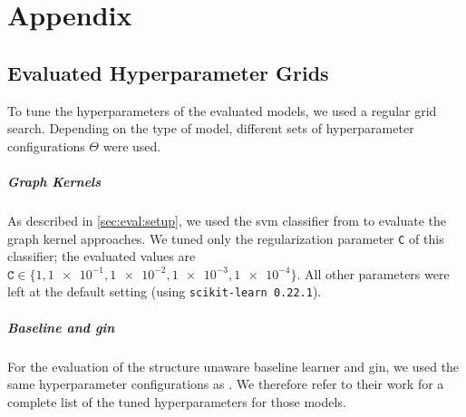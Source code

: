 
\chapter{Appendix}%
\label{sec:appendix}

\section{Evaluated Hyperparameter Grids}%
\label{sec:appendix:config-grid}

To tune the hyperparameters of the evaluated models, we used a regular grid search.
Depending on the type of model, different sets of hyperparameter configurations $\Theta$ were used.

\paragraph{Graph Kernels}
As described in \cref{sec:eval:setup}, we used the \ac{svm} classifier from  to evaluate the graph kernel approaches.
We tuned only the regularization parameter \texttt{C} of this classifier;
the evaluated values are $\mathtt{C} \in \{ 1, \num{1e-1},\allowbreak \num{1e-2},\allowbreak \num{1e-3},\allowbreak \num{1e-4} \}$.
All other parameters were left at the default setting (using \texttt{scikit-learn 0.22.1}).

\paragraph{Baseline and \ac{gin}}
For the evaluation of the structure unaware baseline learner and \ac{gin}, we used the same hyperparameter configurations as \citet{Errica2020}.
We therefore refer to their work for a complete list of the tuned hyperparameters for those models.

